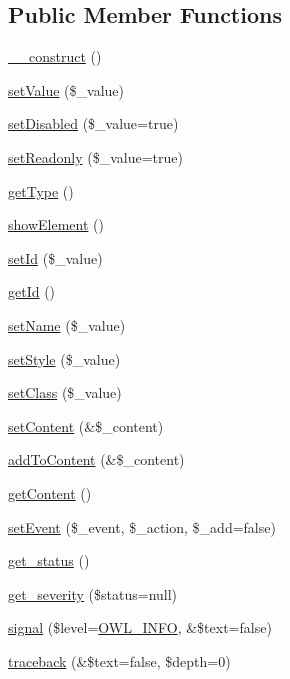 \subsection*{Public Member Functions}
\begin{DoxyCompactItemize}
\item 
\hyperlink{classFormFieldPlugin_a816fc34dd6b56585e728314e6a1b73eb}{\_\-\_\-construct} ()
\item 
\hyperlink{classFormFieldPlugin_af951a690345b35e616d204cf51e8899e}{setValue} (\$\_\-value)
\item 
\hyperlink{classFormFieldPlugin_a91fae1af7cc850ae97f3f79652824b8c}{setDisabled} (\$\_\-value=true)
\item 
\hyperlink{classFormFieldPlugin_a866f1fd589c30d9e5bd1e059e4b85905}{setReadonly} (\$\_\-value=true)
\item 
\hyperlink{classFormFieldPlugin_af55e88f21054dfc3a0092c10ef0fbe40}{getType} ()
\item 
\hyperlink{classFormFieldPlugin_a3983c0e5035930d864d40e606ab3670b}{showElement} ()
\item 
\hyperlink{classBaseElement_a0c1ce3d1684ecb78960cf7a97278494e}{setId} (\$\_\-value)
\item 
\hyperlink{classBaseElement_a4a7aa583ee21af392908d7fd42fde790}{getId} ()
\item 
\hyperlink{classBaseElement_a39bafb3609d10048920c20242c2a04c5}{setName} (\$\_\-value)
\item 
\hyperlink{classBaseElement_a6b2b9ff69f6e92db82f91d9c55cda697}{setStyle} (\$\_\-value)
\item 
\hyperlink{classBaseElement_af6597b30fa9798878f6290271043dfa2}{setClass} (\$\_\-value)
\item 
\hyperlink{classBaseElement_a164a9c6e4ee68afa0ad343942ba54d28}{setContent} (\&\$\_\-content)
\item 
\hyperlink{classBaseElement_abd48eef64ca4f419f26d66a0c0419908}{addToContent} (\&\$\_\-content)
\item 
\hyperlink{classBaseElement_af8c86b93bcdcfbc415bf96c622dc5516}{getContent} ()
\item 
\hyperlink{classBaseElement_ad5789f45f16aaa144716ee8558069c31}{setEvent} (\$\_\-event, \$\_\-action, \$\_\-add=false)
\item 
\hyperlink{class__OWL_a99ec771fa2c5c279f80152cc09e489a8}{get\_\-status} ()
\item 
\hyperlink{class__OWL_adf9509ef96858be7bdd9414c5ef129aa}{get\_\-severity} (\$status=null)
\item 
\hyperlink{class__OWL_a51ba4a16409acf2a2f61f286939091a5}{signal} (\$level=\hyperlink{owl_8severitycodes_8php_a139328861128689f2f4def6a399d9057}{OWL\_\-INFO}, \&\$text=false)
\item 
\hyperlink{class__OWL_aa29547995d6741b7d2b90c1d4ea99a13}{traceback} (\&\$text=false, \$depth=0)
\end{DoxyCompactItemize}
